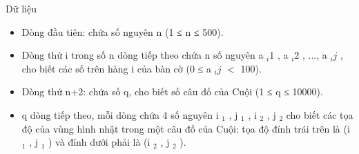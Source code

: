 Dữ liệu
\begin{itemize}
	\item Dòng đầu tiên: chứa số nguyên n (1 ≤ n ≤ 500).
	\item Dòng thứ i trong số n dòng tiếp theo chứa n số nguyên a $_ i1 $ , a $_ i2 $ , ..., a $_ ij $ , cho biết các số trên hàng i của bàn cờ (0 ≤ a $_ ij $ $<$ 100).
	\item Dòng thứ n+2: chứa số q, cho biết số câu đố của Cuội (1 ≤ q ≤ 10000).
	\item q dòng tiếp theo, mỗi dòng chứa 4 số nguyên i $_ 1 $ , j $_ 1 $ , i $_ 2 $ , j $_ 2 $ cho biết các tọa độ của vùng hình nhật trong một câu đố của Cuội: tọa độ đỉnh trái trên là (i $_ 1 $ , j $_ 1 $ ) và đỉnh dưới phải là (i $_ 2 $ , j $_ 2 $ ).
\end{itemize}